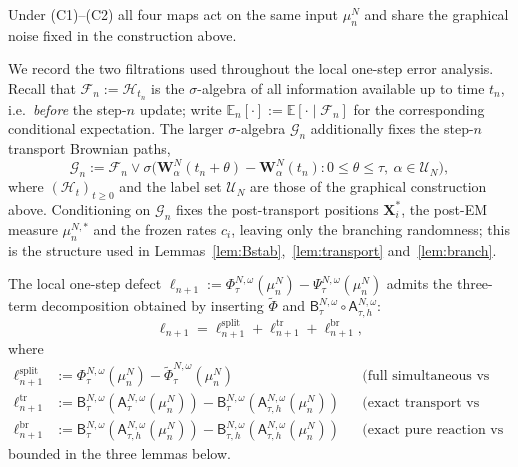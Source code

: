 \documentclass[a4paper,fleqn]{cas-sc}
\theoremstyle{definition}
\theoremstyle{remark}
\begin{document}
Under (C1)--(C2) all four maps act on the same input $\mu^N_n$ and share the
graphical noise fixed in the construction above.

We record the two filtrations used throughout the local one-step error analysis. Recall that
$\mathcal F_n:=\mathcal H_{t_n}$ is the $\sigma$-algebra of all information
available up to time $t_n$, i.e.\ \emph{before} the step-$n$ update;
write $\mathbb E_n[\cdot]:=\mathbb E[\cdot\mid\mathcal F_n]$ for the corresponding
conditional expectation. The larger $\sigma$-algebra
$\mathcal G_n$ additionally fixes the step-$n$ transport Brownian paths,
\begin{equation}\label{eq:filtrations}
\mathcal G_n:=\mathcal F_n\vee\sigma\bigl(\mathbf W^N_\alpha(t_n+\theta)-\mathbf W^N_\alpha(t_n):
0\le\theta\le\tau,\ \alpha\in\mathcal U_N\bigr),
\end{equation}
where $(\mathcal H_t)_{t\ge0}$ and the label set $\mathcal U_N$ are those of the
graphical construction above. Conditioning on $\mathcal G_n$ fixes the
post-transport positions $\mathbf X^*_i$, the post-EM measure $\mu^{N,*}_n$ and
the frozen rates $c_i$, leaving only the branching randomness; this is the
structure used in Lemmas~\ref{lem:Bstab},~\ref{lem:transport}
and~\ref{lem:branch}.

The local one-step defect
$\ell_{n+1}:=\Phi^{N,\omega}_\tau(\mu^N_n)-\Psi^{N,\omega}_\tau(\mu^N_n)$
admits the three-term decomposition obtained by inserting $\widetilde\Phi$ and
$\mathsf B^{N,\omega}_\tau\circ\mathsf A^{N,\omega}_{\tau,h}$:
\[
\ell_{n+1}=\ell^{\mathrm{split}}_{n+1}+\ell^{\mathrm{tr}}_{n+1}+\ell^{\mathrm{br}}_{n+1},
\]
where
\begin{align*}
\ell^{\mathrm{split}}_{n+1}
&:=\Phi^{N,\omega}_\tau(\mu^N_n)-\widetilde\Phi^{N,\omega}_\tau(\mu^N_n)
&&\text{(full simultaneous vs exact Lie split),}\\
\ell^{\mathrm{tr}}_{n+1}
&:=\mathsf B^{N,\omega}_\tau(\mathsf A^{N,\omega}_\tau(\mu^N_n))
   -\mathsf B^{N,\omega}_\tau(\mathsf A^{N,\omega}_{\tau,h}(\mu^N_n))
&&\text{(exact transport vs EM, then exact branching),}\\
\ell^{\mathrm{br}}_{n+1}
&:=\mathsf B^{N,\omega}_\tau(\mathsf A^{N,\omega}_{\tau,h}(\mu^N_n))
   -\mathsf B^{N,\omega}_{\tau,h}(\mathsf A^{N,\omega}_{\tau,h}(\mu^N_n))
&&\text{(exact pure reaction vs frozen-rate branching),}
\end{align*}
bounded in the three lemmas below.
\end{document}

